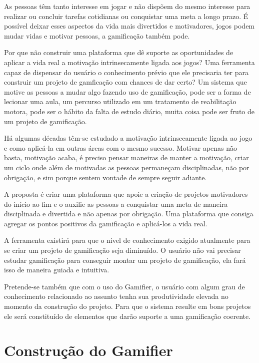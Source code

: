 As pessoas têm tanto interesse em jogar e não dispõem do mesmo interesse para realizar ou concluir tarefas cotidianas ou conquistar uma meta a longo prazo. É possível deixar esses aspectos da vida mais divertidos e motivadores, jogos podem mudar vidas e motivar pessoas, a gamificação também pode.

Por que não construir uma plataforma que dê suporte as oportunidades de aplicar a vida real a motivação intrinsecamente ligada aos jogos? Uma ferramenta capaz de dispensar do usuário o conhecimento prévio que ele precisaria ter para construir um projeto de gamficação com chances de dar certo? Um sistema que motive as pessoas a mudar algo fazendo uso de gamificação, pode ser a forma de lecionar uma aula, um percurso utilizado em um tratamento de reabilitação motora, pode ser o hábito da falta de estudo diário, muita coisa pode ser fruto de um projeto de gamificação.

Há algumas décadas têm-se estudado a motivação intrinsecamente ligada ao jogo e como aplicá-la em outras áreas com o mesmo sucesso. Motivar apenas não basta, motivação acaba, é preciso pensar maneiras de manter a motivação, criar um ciclo onde além de motivadas as pessoas permaneçam disciplinadas, não por obrigação, e sim porque sentem vontade de sempre seguir adiante. 

A proposta é criar uma plataforma que apoie a criação de projetos motivadores do início ao fim e o auxilie as pessoas a conquistar uma meta de maneira disciplinada e divertida e não apenas por  obrigação. Uma plataforma que consiga agregar os pontos positivos da gamificação e aplicá-los a vida real.

A ferramenta existirá para que o nivel de conhecimento exigido atualmente para se criar um projeto de gamificação seja diminuído. O usuário não vai precisar estudar gamificação para conseguir montar um projeto de gamificação, ela fará isso de maneira guiada e intuitiva.

Pretende-se também que com o uso do Gamifier, o usuário com algum grau de conhecimento relacionado ao assunto tenha sua produtividade elevada no momento da construção do projeto. Para que o sistema resulte em bons projetos ele será constituído de elementos que darão suporte a uma gamificação coerente.

\newpage

\section{Construção do Gamifier}

